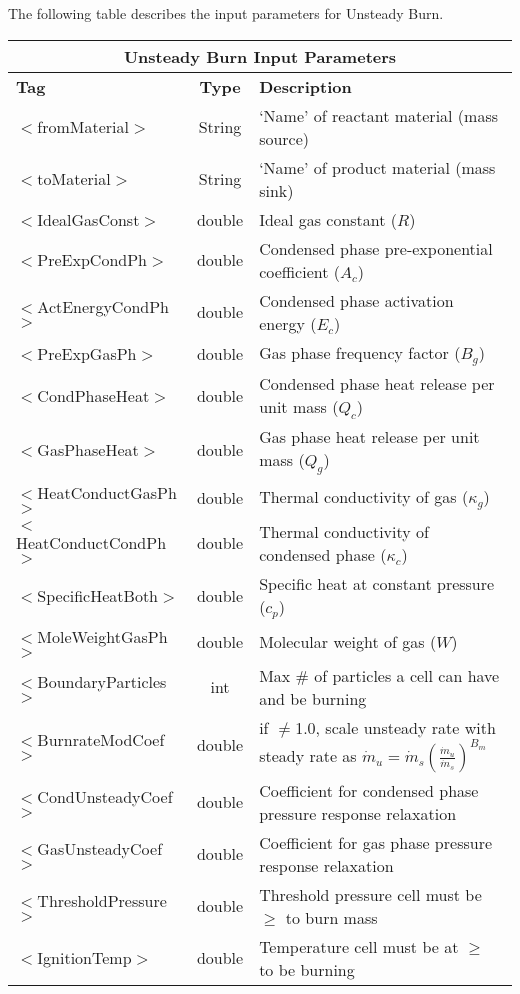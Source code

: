 The following table describes the input parameters for Unsteady Burn.

\begin{center}
\begin{tabular}{| l | c | p{7cm} |}
\hline  
  \multicolumn{3}{|c|}{\textbf{Unsteady Burn Input Parameters}} \\
\hline
\hline
  \textbf{Tag} & \textbf{Type} & \textbf{Description}\\
\hline
  $<$fromMaterial$>$ & String & `Name' of reactant material (mass source)\\
\hline
  $<$toMaterial$>$ & String & `Name' of product material (mass sink)\\
\hline
  $<$IdealGasConst$>$ & double & Ideal gas constant ($R$)\\
\hline
  $<$PreExpCondPh$>$ & double & Condensed phase pre-exponential coefficient ($A_c$) \\
\hline
  $<$ActEnergyCondPh$>$ & double & Condensed phase activation energy ($E_c$)\\
\hline
  $<$PreExpGasPh$>$ & double & Gas phase frequency factor ($B_g$)\\
\hline
  $<$CondPhaseHeat$>$ & double & Condensed phase heat release per unit mass ($Q_c$)\\
\hline
  $<$GasPhaseHeat$>$ & double & Gas phase heat release per unit mass ($Q_g$)\\
\hline
  $<$HeatConductGasPh$>$ & double & Thermal conductivity of gas ($\kappa_g$)\\
\hline
  $<$HeatConductCondPh$>$ & double & Thermal conductivity of condensed phase ($\kappa_c$)\\
\hline
  $<$SpecificHeatBoth$>$ & double & Specific heat at constant pressure ($c_p$)\\
\hline
  $<$MoleWeightGasPh$>$ & double & Molecular weight of gas ($W$)\\
\hline
  $<$BoundaryParticles$>$ & int & Max \# of particles a cell can have and be burning\\
\hline
  $<$BurnrateModCoef$>$ & double & if $\neq$1.0, scale unsteady rate with steady rate as $\dot{m}_u=\dot{m}_s\left(\frac{\displaystyle\dot{m}_u}{\displaystyle\dot{m}_s}\right)^{B_m}$\\
\hline
  $<$CondUnsteadyCoef$>$ & double & Coefficient for condensed phase pressure response relaxation \\
\hline
  $<$GasUnsteadyCoef$>$ & double & Coefficient for gas phase pressure response relaxation \\
\hline
  $<$ThresholdPressure$>$ & double & Threshold pressure cell must be $\ge$ to burn mass\\
\hline
  $<$IgnitionTemp$>$ & double & Temperature cell must be at $\ge$ to be burning\\
\hline
\end{tabular}
\end{center}


